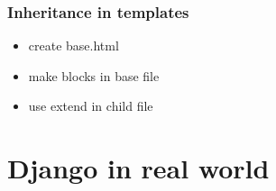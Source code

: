 \documentclass{beamer}
\begin{document}
\begin{frame}
\frametitle{Inheritance in templates}
\begin{itemize}
	\centering
	\large
	\item create base.html
	\item make blocks in base file
	\item use extend in child file
\end{itemize}
\end{frame}


\section{Django in real world}
\begin{frame}	
	\begin{figure}
		\centering
	\end{figure}
\end{frame}
\end{document}
